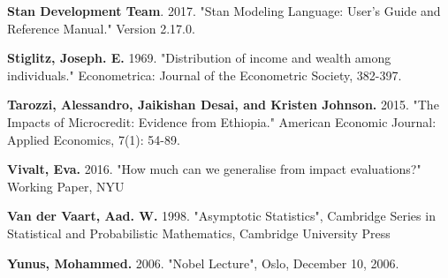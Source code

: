 \documentclass[AER]{AEA}
\begin{document}
\begin{thebibliography}{99}
 \textbf{ Stan Development Team}. 2017. "Stan Modeling Language: User's Guide and Reference Manual." Version 2.17.0.

 \textbf{ Stiglitz, Joseph. E.} 1969. "Distribution of income and wealth among individuals." Econometrica: Journal of the Econometric Society, 382-397.

 \textbf{ Tarozzi, Alessandro, Jaikishan Desai, and Kristen Johnson. }2015. "The Impacts of Microcredit: Evidence from Ethiopia." American Economic Journal: Applied Economics, 7(1): 54-89.

 \textbf{ Vivalt, Eva.} 2016. "How much can we generalise from impact evaluations?" Working Paper, NYU

 \textbf{ Van der Vaart, Aad. W.} 1998. "Asymptotic Statistics", Cambridge Series in Statistical and Probabilistic Mathematics, Cambridge University Press

 \textbf{ Yunus, Mohammed.} 2006. "Nobel Lecture", Oslo, December 10, 2006.


\end{thebibliography}
\end{document}
